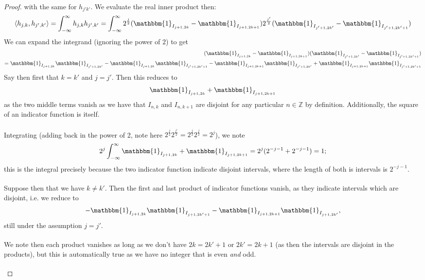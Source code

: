 \documentclass[12pt]{article}
\newenvironment{ex}[2][Exercise]{\begin{trivlist}
\item[\hskip \labelsep {\bfseries #1}\hskip \labelsep {\bfseries #2.}]}{\end{trivlist}}
\begin{document}
\begin{ex}{14}
\begin{enumerate}[label=14.\arabic*]
\begin{proof}
            with the same for $h_{j'k'}$. We evaluate the real inner product then:
            $$\langle h_{j,k}, h_{j',k'} \rangle = \int_{-\infty}^\infty h_{j,k}h_{j',k'} = \int_{-\infty}^\infty 2^{\frac{j}{2}} (\mathbbm{1}_{I_{j + 1, 2k}} - \mathbbm{1}_{I_{j + 1, 2k + 1}})2^{\frac{j'}{2}} (\mathbbm{1}_{I_{j' + 1, 2k'}} - \mathbbm{1}_{I_{j' + 1, 2k' + 1}})$$
            We can expand the integrand (ignoring the power of $2$) to get 
            \begin{align*}
                (\mathbbm{1}_{I_{j + 1, 2k}} - \mathbbm{1}_{I_{j + 1, 2k + 1}})(\mathbbm{1}_{I_{j' + 1, 2k'}} - \mathbbm{1}_{I_{j' + 1, 2k' + 1}}) \\ = \mathbbm{1}_{I_{j + 1, 2k}}\mathbbm{1}_{I_{j' + 1, 2k'}} - \mathbbm{1}_{I_{j + 1, 2k}}\mathbbm{1}_{I_{j' + 1, 2k' + 1}} - \mathbbm{1}_{I_{j + 1, 2k + 1}}\mathbbm{1}_{I_{j' + 1, 2k'}} + \mathbbm{1}_{I_{j + 1, 2k + 1}}\mathbbm{1}_{I_{j' + 1, 2k' + 1}}
            \end{align*}
            Say then first that $k = k'$ and $j = j'$. Then this reduces to 
            $$\mathbbm{1}_{I_{j + 1, 2k}} + \mathbbm{1}_{I_{j + 1, 2k + 1}}$$
            as the two middle terms vanish as we have that $I_{n,k}$ and $I_{n,k + 1}$ are disjoint for any particular $n \in \mathbb{Z}$ by definition. Additionally, the square of an indicator function is itself. \\ \\  
            Integrating (adding back in the power of 2, note here $2^\frac{j}{2}2^\frac{j'}{2} = 2^\frac{j}{2}2^\frac{j}{2} = 2^j$), we note
            $$2^j\int_{-\infty}^\infty \mathbbm{1}_{I_{j + 1, 2k}} + \mathbbm{1}_{I_{j + 1, 2k + 1}} = 2^j(2^{-j - 1} + 2^{-j - 1}) = 1;$$
            this is the integral precisely because the two indicator function indicate disjoint intervals, where the length of both is intervals is $2^{-j - 1}$. \\ \\
            Suppose then that we have $k \neq k'$. Then the first and last product of indicator functions vanish, as they indicate intervals which are disjoint, i.e. we reduce to
            $$- \mathbbm{1}_{I_{j + 1, 2k}}\mathbbm{1}_{I_{j + 1, 2k' + 1}} - \mathbbm{1}_{I_{j + 1, 2k + 1}}\mathbbm{1}_{I_{j + 1, 2k'}},$$
            still under the assumption $j = j'$. \\ \\ We note then each product vanishes as long as we don't have $2k = 2k' + 1$ or $2k' = 2k + 1$ (as then the intervals are disjoint in the products), but this is automatically true as we have no integer that is even \textit{and} odd. \\ \\ 

\end{proof}
\end{enumerate}
\end{ex}
\end{document}
